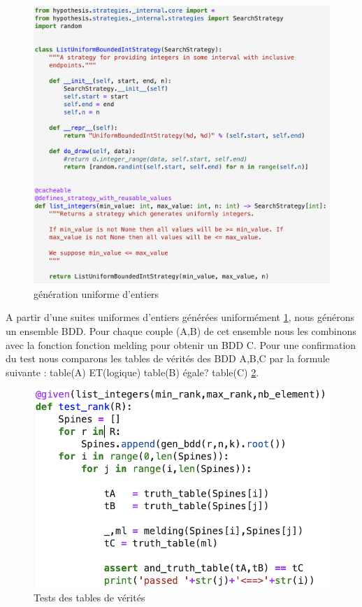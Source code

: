 \documentclass[french]{article}
\begin{document}
\begin{figure}[h!]
    \centering
    \includegraphics[scale=0.4]{geration_uniform.png}
    \caption{génération uniforme d'entiers}
    \label{fig:geration_uniforme}
\end{figure}

A partir d'une suites uniformes d'entiers générées uniformément \ref{fig:geration_uniforme}, nous générons un ensemble BDD. 
Pour chaque couple (A,B) de cet ensemble nous les combinons avec la fonction fonction melding pour
obtenir un BDD C. Pour une confirmation du test nous comparons les tables de vérités des BDD {A,B,C}  par la formule suivante : table(A) ET(logique) table(B) égale? table(C) \ref{fig:test_rank}.

\begin{figure}[h!]
    \centering
    \includegraphics[scale=0.4]{test_rank.png}
    \caption{Tests des tables de vérités}
    \label{fig:test_rank}
\end{figure}
\end{document}
